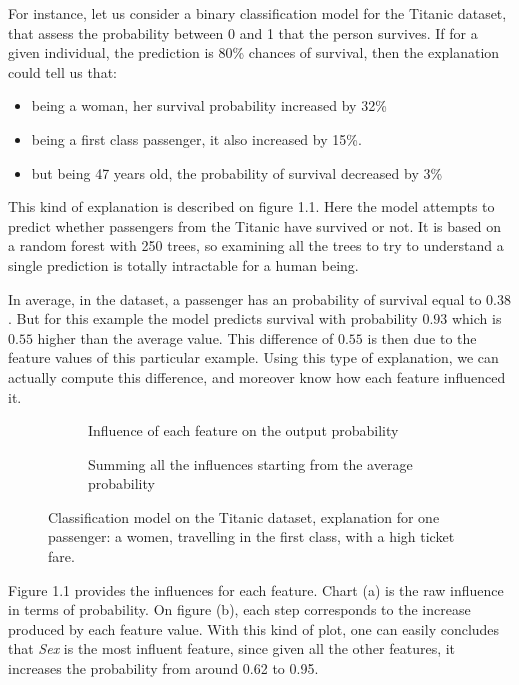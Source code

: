 \documentclass[a4paper,11pt]{kth-mag}
\begin{document}
For instance, let us consider a binary classification model for the Titanic dataset, that assess the probability between 0 and 1 that the person survives.
If for a given individual, the prediction is 80\% chances of survival, then the explanation could tell us that:

\begin{itemize}
\item being a woman, her survival probability increased by 32\%
\item being a first class passenger, it also increased by 15\%.
\item but being 47 years old, the probability of survival decreased by 3\%
\end{itemize}

This kind of explanation is described on figure 1.1. Here the model attempts to predict whether passengers from the Titanic have survived or not. It is based on a random forest with 250 trees, so examining all the trees to try to understand a single prediction is totally intractable for a human being.

In average, in the dataset, a passenger has an probability of survival equal to $0.38$. But for this example the model predicts survival with probability $0.93$ which is $0.55$ higher than the average value. This difference of $0.55$ is then due to the feature values of this particular example. Using this type of explanation, we can actually compute this difference, and moreover know how each feature influenced it. 

\begin{figure}[h!]
	\begin{subfigure}{1.\textwidth}
    	\centering
    	\def\svgwidth{\columnwidth}
    	
    	\caption{Influence of each feature on the output probability}
    \end{subfigure}
	\begin{subfigure}{1.\textwidth}
    	\centering
    	\def\svgwidth{\columnwidth}
    	
    	\caption{Summing all the influences starting from the average probability}
    \end{subfigure}
    \caption{Classification model on the Titanic dataset, explanation for one passenger: a women, travelling in the first class, with a high ticket fare.}
\end{figure}

Figure 1.1 provides the influences for each feature. Chart (a) is the raw influence in terms of probability. On figure (b), each step corresponds to the increase produced by each feature value. With this kind of plot, one can easily concludes that \textit{Sex} is the most influent feature, since given all the other features, it increases the probability from around 0.62 to 0.95.
\end{document}
